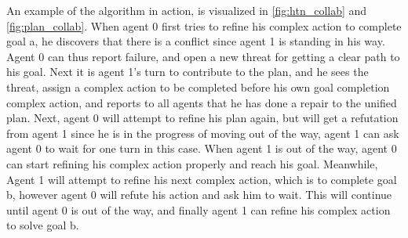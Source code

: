 \documentclass[Main]{subfiles}
\begin{document}
An example of the algorithm in action, is visualized in \ref{fig:htn_collab} and \ref{fig:plan_collab}.
When agent 0 first tries to refine his complex action to complete goal a, he discovers that there is a conflict since agent 1 is standing in his way.
Agent 0 can thus report failure, and open a new threat for getting a clear path to his goal.
Next it is agent 1's turn to contribute to the plan, and he sees the threat, assign a complex action to be completed before his own goal completion complex action, and reports to all agents that he has done a repair to the unified plan.
Next, agent 0 will attempt to refine his plan again, but will get a refutation from agent 1 since he is in the progress of moving out of the way, agent 1 can ask agent 0 to wait for one turn in this case. When agent 1 is out of the way, agent 0 can start refining his complex action properly and reach his goal.
Meanwhile, Agent 1 will attempt to refine his next complex action, which is to complete goal b, however agent 0 will refute his action and ask him to wait. This will continue until agent 0 is out of the way, and finally agent 1 can refine his complex action to solve goal b.




\end{document}
